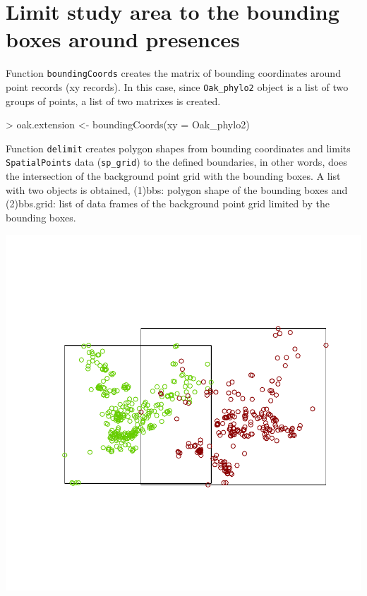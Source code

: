 \documentclass[10pt,a4paper]{article}
\begin{document}
\section{Limit study area to the bounding boxes around presences}

Function \texttt{boundingCoords} creates the matrix of bounding coordinates around point records (xy records). In this case, since \texttt{Oak\_phylo2} object is a list of two groups of points, a list of two matrixes is created.

\begin{Schunk}
\begin{Sinput}
>  oak.extension <- boundingCoords(xy = Oak_phylo2)
\end{Sinput}
\end{Schunk}

Function \texttt{delimit} creates polygon shapes from bounding coordinates and limits \texttt{SpatialPoints} data (\texttt{sp\_grid}) to the defined boundaries, in other words, does the intersection of the background point grid with the bounding boxes. A list with two objects is obtained, (1)bbs: polygon shape of the bounding boxes and (2)bbs.grid: list of data frames of the background point grid limited by the bounding boxes.


\begin{Schunk}
\end{Schunk}
\includegraphics{mopa-mopa6}
\end{document}
